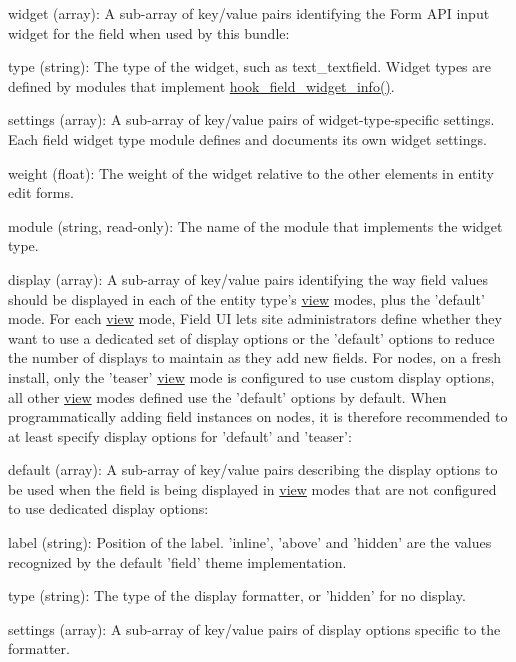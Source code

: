 \begin{DoxyItemize}
\item widget (array): A sub-\/array of key/value pairs identifying the Form API input widget for the field when used by this bundle:
\begin{DoxyItemize}
\item type (string): The type of the widget, such as text\_\-textfield. Widget types are defined by modules that implement \hyperlink{group__field__widget_gac53aa6c2a4ac1215660d25b5d7f20792}{hook\_\-field\_\-widget\_\-info()}.
\item settings (array): A sub-\/array of key/value pairs of widget-\/type-\/specific settings. Each field widget type module defines and documents its own widget settings.
\item weight (float): The weight of the widget relative to the other elements in entity edit forms.
\item module (string, read-\/only): The name of the module that implements the widget type.
\end{DoxyItemize}
\item display (array): A sub-\/array of key/value pairs identifying the way field values should be displayed in each of the entity type's \hyperlink{classview}{view} modes, plus the 'default' mode. For each \hyperlink{classview}{view} mode, Field UI lets site administrators define whether they want to use a dedicated set of display options or the 'default' options to reduce the number of displays to maintain as they add new fields. For nodes, on a fresh install, only the 'teaser' \hyperlink{classview}{view} mode is configured to use custom display options, all other \hyperlink{classview}{view} modes defined use the 'default' options by default. When programmatically adding field instances on nodes, it is therefore recommended to at least specify display options for 'default' and 'teaser':
\begin{DoxyItemize}
\item default (array): A sub-\/array of key/value pairs describing the display options to be used when the field is being displayed in \hyperlink{classview}{view} modes that are not configured to use dedicated display options:
\begin{DoxyItemize}
\item label (string): Position of the label. 'inline', 'above' and 'hidden' are the values recognized by the default 'field' theme implementation.
\item type (string): The type of the display formatter, or 'hidden' for no display.
\item settings (array): A sub-\/array of key/value pairs of display options specific to the formatter.

\end{DoxyItemize}
\end{DoxyItemize}
\end{DoxyItemize}

